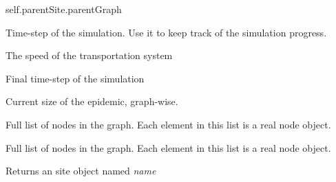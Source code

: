 \documentclass[a4paper,10pt,english]{sphinxmanual}
\begin{document}
\begin{fulllineitems}
\label{scripting:Graph}
self.parentSite.parentGraph

\begin{fulllineitems}
\label{scripting:Graph.simstep}
Time-step of the simulation. Use it to keep track of the simulation progress.

\end{fulllineitems}


\begin{fulllineitems}
\label{scripting:Graph.speed}
The speed of the transportation system

\end{fulllineitems}


\begin{fulllineitems}
\label{scripting:Graph.maxstep}
Final time-step of the simulation

\end{fulllineitems}


\begin{fulllineitems}
\label{scripting:Graph.episize}
Current size of the epidemic, graph-wise.

\end{fulllineitems}


\begin{fulllineitems}
\label{scripting:Graph.site_list}
Full list of nodes in the graph. Each element in this list is a real node object.

\end{fulllineitems}


\begin{fulllineitems}
\label{scripting:Graph.edge_list}
Full list of nodes in the graph. Each element in this list is a real node object.

\end{fulllineitems}


\begin{fulllineitems}
\label{scripting:Graph.getSite}
Returns an site object named \emph{name}

\end{fulllineitems}


\end{fulllineitems}
\end{document}
